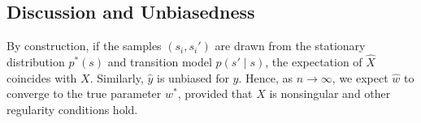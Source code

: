 \subsection{Discussion and Unbiasedness}
By construction, if the samples $(s_i, s_i')$ are drawn from the stationary distribution $p^*(s)$ and transition model $p(s' \mid s)$, the expectation of $\widehat{X}$ coincides with $X$. Similarly, $\widehat{y}$ is unbiased for $y$. Hence, as $n \to \infty$, we expect $\widehat{w}$ to converge to the true parameter $w^*$, provided that $X$ is nonsingular and other regularity conditions hold.
